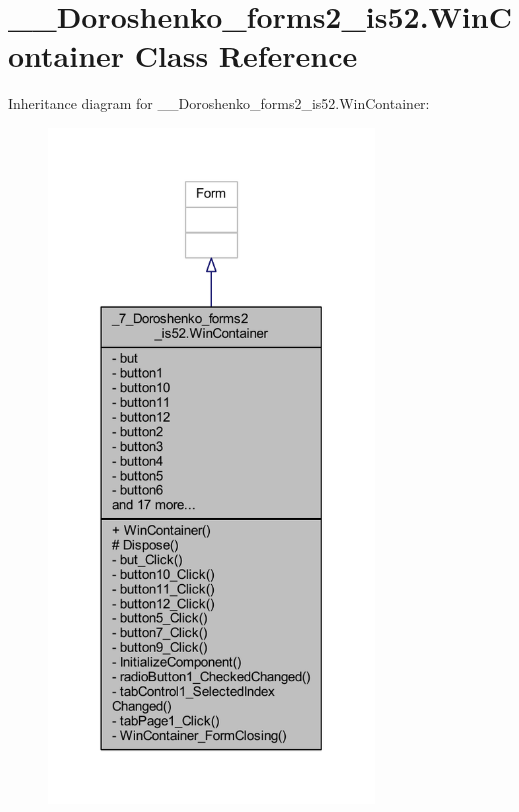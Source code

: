 \hypertarget{class__7___doroshenko__forms2__is52_1_1_win_container}{}\section{\+\_\+\_\+\+Doroshenko\+\_\+forms2\+\_\+is52.\+Win\+Container Class Reference}
\label{class__7___doroshenko__forms2__is52_1_1_win_container}


Inheritance diagram for \+\_\+\_\+\+Doroshenko\+\_\+forms2\+\_\+is52.\+Win\+Container\+:
\nopagebreak
\begin{figure}[H]
\begin{center}
\leavevmode
\includegraphics[width=245pt]{class__7___doroshenko__forms2__is52_1_1_win_container__inherit__graph}
\end{center}
\end{figure}


